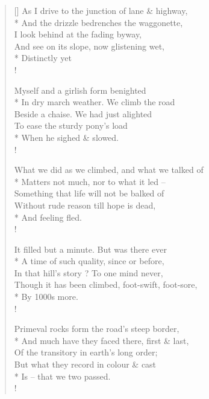 \documentclass[MAIN]{subfiles}
\begin{document}
\settowidth{\versewidth}{As I drive to the junction of lane and highway,}
\begin{verse}[\versewidth]
As I drive to the junction of lane \& highway,\\*
\vin And the drizzle bedrenches the waggonette,\\
I look behind at the fading byway,\\
\vin And see on its slope, now glistening wet,\\*
\vin \vin Distinctly yet\\!

Myself and a girlish form benighted\\*
\vin In dry march weather. We climb the road\\
Beside a chaise. We had just alighted\\
\vin To ease the sturdy pony's load\\*
\vin \vin When he sighed \& slowed.\\!

What we did as we climbed, and what we talked of\\*
\vin Matters not much, nor to what it led --\\
Something that life will not be balked of\\
\vin Without rude reason till hope is dead,\\*
\vin \vin And feeling fled.\\!

It filled but a minute. But was there ever\\*
\vin A time of such quality, since or before,\\
In that hill's story ? To one mind never,\\
\vin Though it has been climbed, foot-swift, foot-sore,\\*
\vin \vin By 1000s more.\\!

Primeval rocks form the road's steep border,\\*
\vin And much have they faced there, first \& last,\\
Of the transitory in earth's long order;\\
\vin But what they record in colour \& cast\\*
\vin \vin Is -- that we two passed.\\!


\end{verse}
\end{document}
